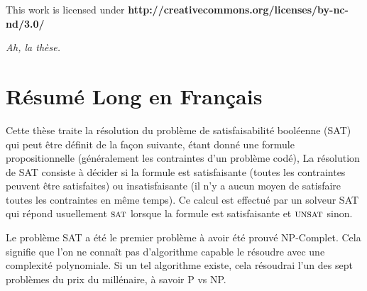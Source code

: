 \clearpage\null\vfill
\thispagestyle{empty}
\begin{minipage}[b]{.9\textwidth}
  \begin{center}
  \setlength{\parskip}{.5\baselineskip}
  {\color{phdcol0}%
   \ccLogo\hspace{.1cm}%
   \ccAttribution\hspace{.1cm}%
   \ccNonCommercial\hspace{.1cm}%
   \ccNoDerivatives}\hspace{.15cm}%
  \footnotesize%
  This work is licensed under {\color{phdcol1}\textbf{http://creativecommons.org/licenses/by-nc-nd/3.0/}}
  \end{center}
\end{minipage}
\vspace*{2\baselineskip}

\clearpage

\thispagestyle{empty}
\begin{flushright}
  \textit{Ah, la thèse.}
\end{flushright}
%
%
%

%
\chapter*{Résumé Long en Français}

Cette thèse traite la résolution du problème de satisfaisabilité booléenne (SAT)
qui peut être définit de la façon suivante,
étant donné une formule propositionnelle (généralement les contraintes d'un problème codé),
La résolution de SAT consiste à décider si la formule est satisfaisante (toutes les contraintes peuvent être
satisfaites) ou insatisfaisante (il n'y a aucun moyen de satisfaire toutes les contraintes en même
temps). Ce calcul est effectué par un solveur SAT qui répond usuellement $\textsc{sat}$ lorsque la formule est satisfaisante et $\textsc{unsat}$ sinon.
 
Le problème SAT a été le premier problème à avoir été prouvé NP-Complet. Cela signifie que
l'on ne connaît pas d'algorithme capable le résoudre avec une complexité polynomiale.
Si un tel algorithme existe, cela résoudrai l'un des sept problèmes du prix du millénaire, à savoir 
P vs NP.

